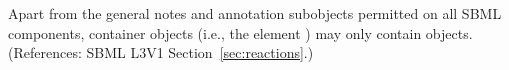 Apart from the general notes and annotation subobjects permitted on all
SBML components, \ListOfModifierSpeciesReferences container objects (i.e.,
the \Reaction element ) may only contain
\ModifierSpeciesReference objects.  (References: SBML L3V1
Section~\ref{sec:reactions}.)
